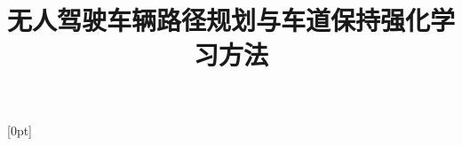 \makeatletter
\def\@cite#1#2{\textsuperscript{[{#1\if@tempswa , #2\fi}]}}
\makeatother

\usepackage{titletoc}
[0pt]{\addvspace{2pt}\filright}
{\contentspush{\thecontentslabel\ }}
{}{\contentspage}

\usepackage{graphicx}
\usepackage{caption}
\usepackage{subfigure}
\usepackage{enumerate}
\usepackage{minted}
\usepackage{pdfpages}
\usepackage{afterpage}
\allowdisplaybreaks[1]


\newcommand{\h}{\tilde{h}}
\renewcommand{\k}{\kappa}
\renewcommand{\b}{\beta}
\renewcommand{\t}{\theta}
\newcommand{\la}{\lambda}
\newcommand{\La}{\Lambda}
\newcommand{\kk}{\tilde{\kappa}}
\renewcommand{\L}{\mathscr{L}}
\newcommand{\A}{\mathscr{A}}
\newcommand{\F}{\mathbf{F}}
\newcommand{\p}{\mathbf{p}}

\newcommand{\blank}[1]{\hspace*{#1}}
\newcommand{\sectionend}{\ifodd\value{page}\afterpage{\null}\else\fi\newpage\vspace*{0pt}}
\usepackage{dutchcal}

\pagestyle{fancy}
\lhead{}
\rhead{}
\renewcommand{\headrulewidth}{0.4pt}
\renewcommand{\footrulewidth}{0pt}



\title{ \bfseries  无人驾驶车辆路径规划与车道保持强化学习方法}
\author{}
\date{}










